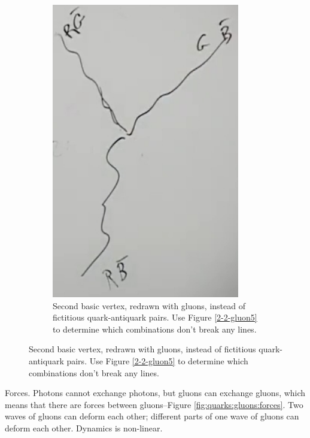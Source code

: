 \documentclass[]{article}
\begin{document}
\begin{figure}[H]
\begin{subfigure}{0.45\textwidth}
	\end{subfigure}
	\begin{subfigure}{0.45\textwidth}
		\caption{Second basic vertex, redrawn with gluons, instead of fictitious quark-antiquark pairs. Use Figure \ref{2-2-gluon5} to determine which combinations don't break any lines.}\label{2-2-gluon6}
		\includegraphics[width=0.9\textwidth]{2-2-gluon6}
	\end{subfigure}
\end{figure}

Forces. Photons cannot exchange photons, but gluons can exchange gluons, which means that there are forces between gluons--Figure \ref{fig:quarks:gluons:forces}. Two waves of gluons can deform each other; different parts of one wave of gluons can deform each other. Dynamics is non-linear.
\end{document}
